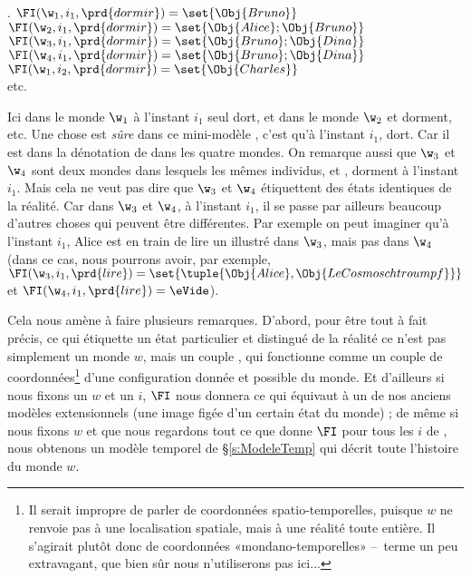 \ex.  \label{x:M.w}
\(\FI(\w_1,i_1,\prd{dormir})=\set{\Obj{Bruno}}\)\\
\(\FI(\w_2,i_1,\prd{dormir})=\set{\Obj{Alice};\Obj{Bruno}}\)\\
\(\FI(\w_3,i_1,\prd{dormir})=\set{\Obj{Bruno};\Obj{Dina}}\)\\
\(\FI(\w_4,i_1,\prd{dormir})=\set{\Obj{Bruno};\Obj{Dina}}\)\\
\(\FI(\w_1,i_2,\prd{dormir})=\set{\Obj{Charles}}\)\\
etc.


Ici dans le monde $\w_1$ à l'instant $i_1$ seul  dort, et dans le monde $\w_2$  et  dorment, etc. Une chose est \emph{sûre} dans ce mini-modèle \Modele, c'est qu'à l'instant $i_1$,  dort. Car il est dans la dénotation de  dans les quatre mondes. 
On remarque aussi que $\w_3$ et $\w_4$ sont deux mondes dans lesquels les mêmes individus,
 et , dorment à l'instant $i_1$.  Mais cela ne
veut pas dire que $\w_3$ et $\w_4$ étiquettent des états identiques de
la réalité.  Car dans $\w_3$ et $\w_4$, à l'instant $i_1$, il se passe
par ailleurs beaucoup d'autres choses qui peuvent être différentes.
Par exemple on peut imaginer qu'à l'instant $i_1$, Alice
est en train de lire un illustré  dans $\w_3$, mais pas dans $\w_4$ (dans ce cas, nous pourrons avoir, par exemple, \(\FI(\w_3,i_1,\prd{lire})=\set{\tuple{\Obj{Alice},\Obj{LeCosmoschtroumpf}}}\) et 
\(\FI(\w_4,i_1,\prd{lire})=\eVide\)).

Cela nous amène à faire plusieurs remarques. D'abord, pour être tout à fait précis, ce qui étiquette un état particulier et distingué de la réalité ce n'est pas simplement un monde $w$, mais un couple , qui fonctionne comme un couple de coordonnées\footnote{Il serait impropre de parler de coordonnées spatio-temporelles, puisque $w$ ne renvoie pas à une localisation spatiale, mais à une réalité toute entière. Il s'agirait plutôt donc de coordonnées {«mondano-temporelles»} --~terme un peu extravagant, que bien sûr nous n'utiliserons pas ici...} d'une configuration donnée et possible du monde.  Et d'ailleurs si nous fixons un $w$ et un $i$, $\FI$ nous donnera ce qui équivaut à un de nos anciens modèles extensionnels (une image figée d'un certain état du monde) ; de même si nous fixons $w$ et que nous regardons tout ce que donne $\FI$ pour tous les $i$ de \Tps, nous obtenons un modèle temporel de \S\ref{s:ModeleTemp} qui décrit toute l'histoire du monde $w$.  

\newpage

